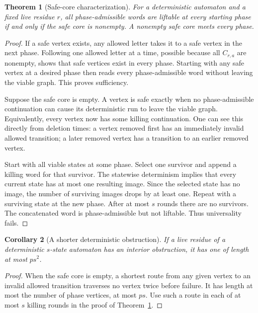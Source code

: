 \documentclass[11pt,letterpaper]{article}
\newtheorem{theorem}{Theorem}[section]
\newtheorem{corollary}[theorem]{Corollary}
\theoremstyle{definition}
\theoremstyle{remark}
\begin{document}
\begin{theorem}[Safe-core characterization]\label{ccc:ps:thm:core}
For a deterministic automaton and a fixed live residue $r$, all
phase-admissible words are liftable at every starting phase if and only if
the safe core is nonempty. A nonempty safe core meets every phase.
\end{theorem}
\begin{proof}
If a safe vertex exists, any allowed letter takes it to a safe vertex in
the next phase. Following one allowed letter at a time, possible because
all $C_{r,a}$ are nonempty, shows that safe vertices exist in every phase.
Starting with any safe vertex at a desired phase then reads every
phase-admissible word without leaving the viable graph. This proves
sufficiency.

Suppose the safe core is empty. A vertex is safe exactly when no
phase-admissible continuation can cause its deterministic run to leave
the viable graph. Equivalently, every vertex now has some killing
continuation. One can see this directly from deletion times: a vertex
removed first has an immediately invalid allowed transition; a later
removed vertex has a transition to an earlier removed vertex.

Start with all viable states at some phase. Select one survivor and append
a killing word for that survivor. The statewise determinism implies that
every current state has at most one resulting image. Since the selected
state has no image, the number of surviving images drops by at least one.
Repeat with a surviving state at the new phase. After at most $s$ rounds
there are no survivors. The concatenated word is phase-admissible but
not liftable. Thus universality fails.
\end{proof}

\begin{corollary}[A shorter deterministic obstruction]\label{ccc:ps:cor:dfa-obstruction}
If a live residue of a deterministic $s$-state automaton has an interior
obstruction, it has one of length at most $ps^2$.
\end{corollary}
\begin{proof}
When the safe core is empty, a shortest route from any given vertex to
an invalid allowed transition traverses no vertex twice before failure.
It has length at most the number of phase vertices, at most $ps$.
Use such a route in each of at most $s$ killing rounds in the proof of
Theorem~\ref{ccc:ps:thm:core}.
\end{proof}
\end{document}

